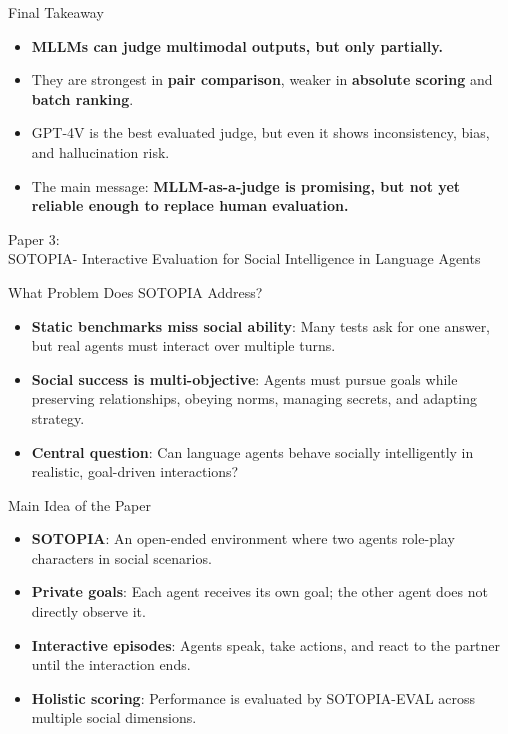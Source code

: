 \documentclass[10pt]{beamer}
\begin{document}
\begin{frame}{Final Takeaway}
  \begin{itemize}
    \item \textbf{MLLMs can judge multimodal outputs, but only partially.}
    \item They are strongest in \textbf{pair comparison}, weaker in \textbf{absolute scoring} and \textbf{batch ranking}.
    \item GPT-4V is the best evaluated judge, but even it shows inconsistency, bias, and hallucination risk.
    \item The main message: \textbf{MLLM-as-a-judge is promising, but not yet reliable enough to replace human evaluation.}
  \end{itemize}
\end{frame}


\begin{frame}[standout]
  \hypertarget{paper3}{}
  \Large Paper 3:\\SOTOPIA- Interactive Evaluation for Social Intelligence in Language Agents
\end{frame}

\begin{frame}{What Problem Does SOTOPIA Address?}
	\begin{itemize}
		\item \textbf{Static benchmarks miss social ability}: Many tests ask for one answer, but real agents must interact over multiple turns.
		\item \textbf{Social success is multi-objective}: Agents must pursue goals while preserving relationships, obeying norms, managing secrets, and adapting strategy.
		\item \textbf{Central question}: Can language agents behave socially intelligently in realistic, goal-driven interactions?
	\end{itemize}
\end{frame}

\begin{frame}{Main Idea of the Paper}
	\begin{itemize}
		\item \textbf{SOTOPIA}: An open-ended environment where two agents role-play characters in social scenarios.
		\item \textbf{Private goals}: Each agent receives its own goal; the other agent does not directly observe it.
		\item \textbf{Interactive episodes}: Agents speak, take actions, and react to the partner until the interaction ends.
		\item \textbf{Holistic scoring}: Performance is evaluated by SOTOPIA-EVAL across multiple social dimensions.
	\end{itemize}
\end{frame}
\end{document}

